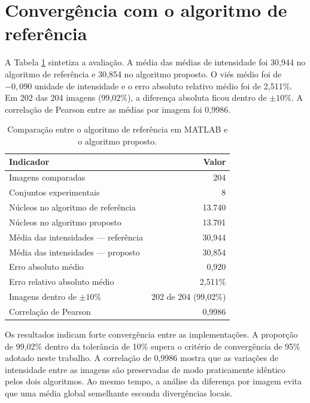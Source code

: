 \section{Convergência com o algoritmo de referência}

A Tabela \ref{tab:comparacao-metodos} sintetiza a avaliação. A média das médias de intensidade foi 30,944 no algoritmo de referência e 30,854 no algoritmo proposto. O viés médio foi de $-0{,}090$ unidade de intensidade e o erro absoluto relativo médio foi de 2,511\%. Em 202 das 204 imagens (99,02\%), a diferença absoluta ficou dentro de $\pm 10\%$. A correlação de Pearson entre as médias por imagem foi 0,9986.

\begin{table}[htb]
    \centering
    \caption{Comparação entre o algoritmo de referência em MATLAB e o algoritmo proposto.}
    \label{tab:comparacao-metodos}
    \begin{tabular}{|p{}|r|}
        \hline
        \textbf{Indicador} & \textbf{Valor} \\
        \hline
        Imagens comparadas & 204 \\
        \hline
        Conjuntos experimentais & 8 \\
        \hline
        Núcleos no algoritmo de referência & 13.740 \\
        \hline
        Núcleos no algoritmo proposto & 13.701 \\
        \hline
        Média das intensidades --- referência & 30,944 \\
        \hline
        Média das intensidades --- proposto & 30,854 \\
        \hline
        Erro absoluto médio & 0,920 \\
        \hline
        Erro relativo absoluto médio & 2,511\% \\
        \hline
        Imagens dentro de $\pm 10\%$ & 202 de 204 (99,02\%) \\
        \hline
        Correlação de Pearson & 0,9986 \\
        \hline
    \end{tabular}
\end{table}

Os resultados indicam forte convergência entre as implementações. A proporção de 99,02\% dentro da tolerância de 10\% supera o critério de convergência de 95\% adotado neste trabalho. A correlação de 0,9986 mostra que as variações de intensidade entre as imagens são preservadas de modo praticamente idêntico pelos dois algoritmos. Ao mesmo tempo, a análise da diferença por imagem evita que uma média global semelhante esconda divergências locais.

